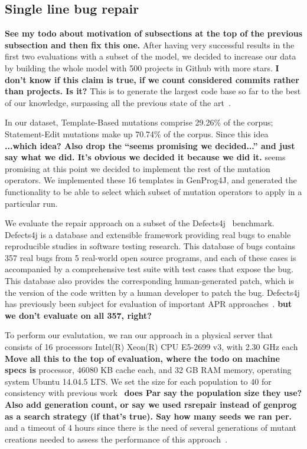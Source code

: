 \documentclass[conference]{IEEEtran}
\newcommand{\todo}[1]
  {{\scriptsize \textbf{\color{red} {#1}}}}
\begin{document}
\subsection{Single line bug repair}
\label{sec:single}

\todo{See my todo about motivation of subsections at the top of the previous
  subsection and then fix this one.}
After having very successful results in the first two evaluations with a subset of the model, we decided 
to increase our data by building the whole model with 500 projects in Github with more 
stars.\todo{I don't know if this claim is true, if we count considered commits
  rather than projects.  Is it?} This is to generate the largest code base so far to the best 
of our knowledge, surpassing all the previous state of the 
art~\cite{long15,Soto15,zhong15,matias15,xuan16}. 

In our dataset, Template-Based mutations comprise 29.26\% of the corpus; Statement-Edit mutations make up 70.74\% of the 
corpus. Since this idea\todo{...which idea? Also drop the ``seems promising we
  decided...'' and just say what we did.  It's obvious we decided it because we
  did it.} seems promising at this point we decided to implement the rest 
of the mutation operators. We implemented these 16 templates in GenProg4J, and generated the functionality 
to be able to select which subset of mutation operators to apply in a particular 
run.

We evaluate the repair approach on a subset of the Defects4j~\cite{just14}
benchmark.  Defects4j is a database and extensible 
framework providing real bugs to enable reproducible studies in software testing 
research. This database of bugs contains 357 real bugs from 5 
real-world open source programs, and each of these cases is accompanied by a 
comprehensive test suite with test cases that expose the bug. This database also provides 
the corresponding human-generated patch, which is the version of the code written by a human 
developer to patch the bug. Defects4j has previously been 
subject for evaluation of important APR approaches~\cite{Durieux15}.\todo{but we
  don't evaluate on all 357, right?}

To perform our evalutation, we ran our approach in a physical server that 
consists of 16 processors Intel(R) Xeon(R) CPU E5-2699 v3, with 2.30 GHz each
\todo{Move all this to the top of evaluation, where the todo on machine specs is}
processor, 46080 KB cache each, and 32 GB RAM memory, operating system Ubuntu 
14.04.5 LTS. We set the size for each population to 40 for consistency with 
previous work~\cite{legoues12,kim2013}\todo{does Par say the population size
  they use? Also add generation count, or say we used rsrepair instead of
  genprog as a search strategy (if that's true).  Say how many seeds we ran per.}  and a timeout of 4 hours since there is 
the need of several generations of mutant creations needed to assess the 
performance of this approach~\cite{arcuri11}.
\end{document}
